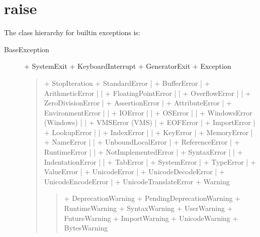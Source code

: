 \documentclass[letterpaper,10pt,brazil]{sphinxmanual}
\begin{document}
\chapter{raise}
\label{\detokenize{content/except:raise}}\label{\detokenize{content/except::doc}}
The class hierarchy for built\sphinxhyphen{}in exceptions is:
\begin{description}
\item[{BaseException}] \leavevmode
+\textendash{} SystemExit
+\textendash{} KeyboardInterrupt
+\textendash{} GeneratorExit
+\textendash{} Exception
\begin{quote}

+\textendash{} StopIteration
+\textendash{} StandardError
|    +\textendash{} BufferError
|    +\textendash{} ArithmeticError
|    |    +\textendash{} FloatingPointError
|    |    +\textendash{} OverflowError
|    |    +\textendash{} ZeroDivisionError
|    +\textendash{} AssertionError
|    +\textendash{} AttributeError
|    +\textendash{} EnvironmentError
|    |    +\textendash{} IOError
|    |    +\textendash{} OSError
|    |         +\textendash{} WindowsError (Windows)
|    |         +\textendash{} VMSError (VMS)
|    +\textendash{} EOFError
|    +\textendash{} ImportError
|    +\textendash{} LookupError
|    |    +\textendash{} IndexError
|    |    +\textendash{} KeyError
|    +\textendash{} MemoryError
|    +\textendash{} NameError
|    |    +\textendash{} UnboundLocalError
|    +\textendash{} ReferenceError
|    +\textendash{} RuntimeError
|    |    +\textendash{} NotImplementedError
|    +\textendash{} SyntaxError
|    |    +\textendash{} IndentationError
|    |         +\textendash{} TabError
|    +\textendash{} SystemError
|    +\textendash{} TypeError
|    +\textendash{} ValueError
|         +\textendash{} UnicodeError
|              +\textendash{} UnicodeDecodeError
|              +\textendash{} UnicodeEncodeError
|              +\textendash{} UnicodeTranslateError
+\textendash{} Warning
\begin{quote}

+\textendash{} DeprecationWarning
+\textendash{} PendingDeprecationWarning
+\textendash{} RuntimeWarning
+\textendash{} SyntaxWarning
+\textendash{} UserWarning
+\textendash{} FutureWarning
+\textendash{} ImportWarning
+\textendash{} UnicodeWarning
+\textendash{} BytesWarning
\end{quote}
\end{quote}

\end{description}
\end{document}
